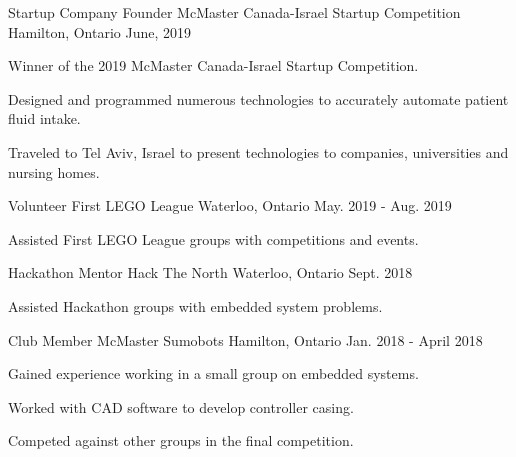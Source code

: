 
\begin{cventries}

  \cventry
    {Startup Company Founder} %
    {McMaster Canada-Israel Startup Competition} %
    {Hamilton, Ontario} %
    {June, 2019} %
    {
      \begin{cvitems} %
        \item {Winner of the 2019 McMaster Canada-Israel Startup Competition.}
        \item {Designed and programmed numerous technologies to accurately automate patient fluid intake.}
        \item {Traveled to Tel Aviv, Israel to present technologies to companies, universities and nursing homes.}
      \end{cvitems}
    }

  \cventry
    {Volunteer} %
    {First LEGO League} %
    {Waterloo, Ontario} %
    {May. 2019 - Aug. 2019} %
    {
      \begin{cvitems} %
        \item {Assisted First LEGO League groups with competitions and events.}
      \end{cvitems}
    }

  \cventry
    {Hackathon Mentor} %
    {Hack The North} %
    {Waterloo, Ontario} %
    {Sept. 2018} %
    {
      \begin{cvitems} %
        \item {Assisted Hackathon groups with embedded system problems.}
      \end{cvitems}
    }

  \cventry
    {Club Member} %
    {McMaster Sumobots} %
    {Hamilton, Ontario} %
    {Jan. 2018 - April 2018} %
    {
      \begin{cvitems} %
        \item {Gained experience working in a small group on embedded systems.}
        \item {Worked with CAD software to develop controller casing.}
        \item {Competed against other groups in the final competition.}
      \end{cvitems}
    }
    

\end{cventries}
